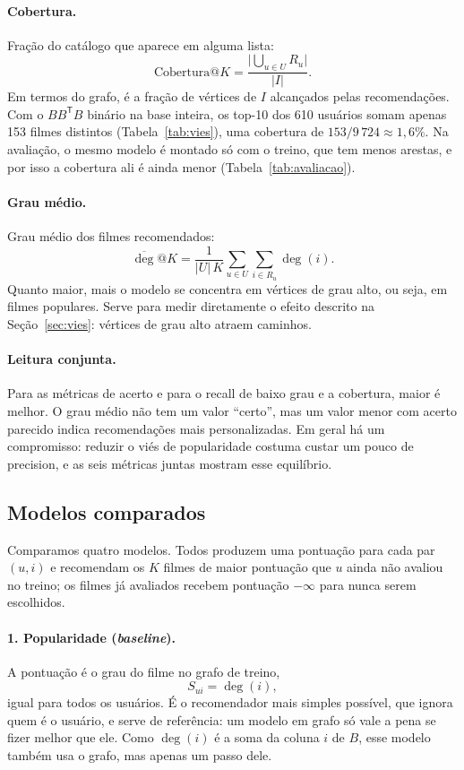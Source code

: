 \documentclass[12pt,a4paper]{article}
\theoremstyle{definition}
\begin{document}
\paragraph{Cobertura.}
Fração do catálogo que aparece em alguma lista:
\[
  \mathrm{Cobertura@}K = \frac{\bigl|\bigcup_{u \in U} R_u\bigr|}{|I|}.
\]
Em termos do grafo, é a fração de vértices de $I$ alcançados pelas
recomendações. Com o $BB^{\mathsf T}B$ binário na base inteira, os top-10
dos 610 usuários somam apenas 153 filmes distintos (Tabela~\ref{tab:vies}),
uma cobertura de $153/9\,724 \approx 1{,}6\%$. Na avaliação, o mesmo modelo
é montado só com o treino, que tem menos arestas, e por isso a cobertura
ali é ainda menor (Tabela~\ref{tab:avaliacao}).

\paragraph{Grau médio.}
Grau médio dos filmes recomendados:
\[
  \overline{\deg}\mathrm{@}K = \frac{1}{|U|\,K} \sum_{u \in U} \sum_{i \in R_u} \deg(i).
\]
Quanto maior, mais o modelo se concentra em vértices de grau alto, ou
seja, em filmes populares. Serve para medir diretamente o efeito descrito
na Seção~\ref{sec:vies}: vértices de grau alto atraem caminhos.

\paragraph{Leitura conjunta.}
Para as métricas de acerto e para o recall de baixo grau e a cobertura,
maior é melhor. O grau médio não tem um valor ``certo'', mas um valor
menor com acerto parecido indica recomendações mais personalizadas. Em
geral há um compromisso: reduzir o viés de popularidade costuma custar um
pouco de precision, e as seis métricas juntas mostram esse equilíbrio.

\subsection{Modelos comparados}\label{sec:modelos}

Comparamos quatro modelos. Todos produzem uma pontuação para cada par
$(u, i)$ e recomendam os $K$ filmes de maior pontuação que $u$ ainda não
avaliou no treino; os filmes já avaliados recebem pontuação $-\infty$
para nunca serem escolhidos.

\paragraph{1. Popularidade (\emph{baseline}).}
A pontuação é o grau do filme no grafo de treino,
\[
  S_{ui} = \deg(i),
\]
igual para todos os usuários. É o recomendador mais simples possível, que
ignora quem é o usuário, e serve de referência: um modelo em grafo só vale
a pena se fizer melhor que ele. Como $\deg(i)$ é a soma da coluna $i$ de
$B$, esse modelo também usa o grafo, mas apenas um passo dele.
\end{document}
